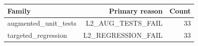 \begin{tabular}{lrr}
\hline
Family & Primary reason & Count \\
\hline
augmented\_unit\_tests & L2\_AUG\_TESTS\_FAIL & 33 \\
targeted\_regression & L2\_REGRESSION\_FAIL & 33 \\
\hline
\end{tabular}
